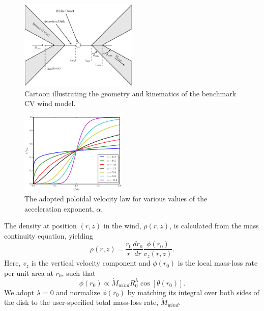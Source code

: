 \documentclass[preprint, a4paper, 11pt]{aastex}
\begin{document}
\begin{figure} 
\centering
\includegraphics[width=0.5\textwidth]{figures/fig2_cartoon.eps}
\caption{Cartoon illustrating the geometry and kinematics of the benchmark CV wind model.}
\label{cartoon}
\end{figure} 

\begin{figure}
\centering
\includegraphics[width=0.45\textwidth]{figures/acc_law.eps}
\caption{
The adopted poloidal velocity law for various values of the
acceleration exponent, $\alpha$.
} 
\label{acc_law}
\end{figure}

The density at position $(r,z)$ in the wind, $\rho(r,z)$, is
calculated from the mass continuity equation, yielding
\begin{equation}
\rho(r,z) = \frac{r_0}{r} \frac{dr_0}{dr} \frac{\phi(r_0)}{v_z(r,z)}.
\label{density}
\end{equation}
Here, 
$v_z$ is the vertical velocity component and $\phi(r_0)$ 
is the local mass-loss rate per unit area at $r_0$, 
such that 
\begin{equation}
\phi(r_0) \propto \dot{M}_{wind} R_0^\lambda \cos [\theta(r_0)].
\label{density}
\end{equation}
We adopt $\lambda = 0$ and normalize $\phi(r_0)$ by 
matching its integral over both sides of the disk
to the user-specified total mass-loss rate, $\dot{M}_{wind}$. 
\end{document}
